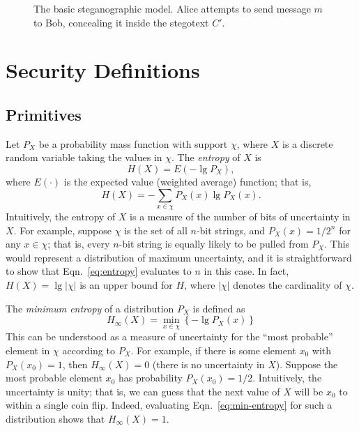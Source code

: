 \documentclass[11pt]{article}
\renewcommand\l{\mathopen{}\left}
\renewcommand\r{\right}
\newcommand\abs[1]{\l\vert #1 \r\vert}
\begin{document}
\begin{figure}[htbp]
  \label{fig:model}
  \centering
  
  \begin{minipage}[t]{.8\linewidth}
    \centering
    \caption{The basic steganographic model. Alice attempts to send
    message $m$ to Bob, concealing it inside the stegotext $C'$.}
  \end{minipage}
\end{figure}

\section{Security Definitions}
\subsection{Primitives}
Let $P_X$ be a probability mass function with support $\chi$, where $X$
is a discrete random variable taking the values in $\chi$. The
\emph{entropy} of $X$ is
\begin{equation*}
  H(X) = E\l( -\lg P_X \r),
\end{equation*}
where $E(\cdot)$ is the expected value (weighted average) function;
that is,
\begin{equation}
  H(X) = - \sum_{x\in \chi} P_X(x) \lg P_X(x).
  \label{eq:entropy}
\end{equation}
Intuitively, the entropy of $X$ is a measure of the number of bits of
uncertainty in $X$. For example, suppose $\chi$ is the set of all
$n$-bit strings, and $P_X(x) = 1 / 2^n$ for any $x \in \chi$; that
is, every $n$-bit string is equally likely to be pulled from $P_X$.
This would represent a distribution of maximum uncertainty, and it is
straightforward to show that Eqn.~\eqref{eq:entropy} evaluates to $n$
in this case. In fact, $H(X) = \lg \abs{\chi}$ is an upper bound for
$H$, where $\abs \chi$ denotes the cardinality of $\chi$.

The \emph{minimum entropy} of a distribution $P_X$ is defined as
\begin{equation}
  H_\infty\l( X \r) = \min_{x \in \chi} \l\{ -\lg P_X(x) \r\}
  \label{eq:min-entropy}
\end{equation}
This can be understood as a measure of uncertainty for the ``most
probable'' element in $\chi$ according to $P_X$. For example, if there
is some element $x_0$ with $P_X(x_0) = 1$, then $H_\infty(X) = 0$
(there is no uncertainty in $X$). Suppose the most probable element
$x_0$ has probability $P_X(x_0) = 1/2$. Intuitively, the uncertainty
is unity; that is, we can guess that the next value of $X$ will be
$x_0$ to within a single coin flip. Indeed, evaluating
Eqn.~\eqref{eq:min-entropy} for such a distribution shows that
$H_\infty\l( X \r) = 1$.
\end{document}

